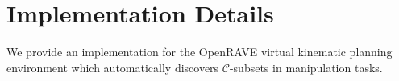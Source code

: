 \section{Implementation Details}

We provide an implementation for the
OpenRAVE \citep{diankov2010openrave}
virtual kinematic planning environment
which automatically discovers $\mathcal{C}$-subsets
in manipulation tasks.


%
%
%
%
%
%
%
%
%
%
%
%
%
